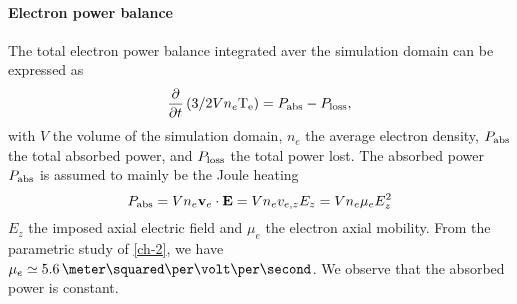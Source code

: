     
    \paragraph{Electron power balance\\}
    The total electron power balance integrated aver the simulation domain can be expressed as
    \begin{equation} \label{eq-GMel}
      \frac{\partial }{\partial t} \left( 3/2 V n_e \mathrm{T_e} \right) = P_{\rm abs} - P_{\rm loss},
    \end{equation}
    with $V$ the  volume of the simulation domain, $n_e$ the average electron density,  $P_{\rm abs}$ the total absorbed power, and $P_{\rm loss}$ the total power lost.
    The absorbed power $P_{\rm abs}$ is assumed to mainly be the Joule heating
    \begin{equation} \label{eq-pabs}
      P_{\rm abs} = V n_e {\mathbf v_e} \cdot {\mathbf E} = V n_e v_{e, z} E_z = V n_e \mu_e  E_z^2
    \end{equation}
    $E_z$ the imposed axial electric field and $\mu_e$ the electron axial mobility.
    From the parametric study of \cref{ch-2}, we have $\mu_e \simeq 5.6 \,\meter\squared\per\volt\per\second$.
    We observe that the absorbed power is constant.
    
